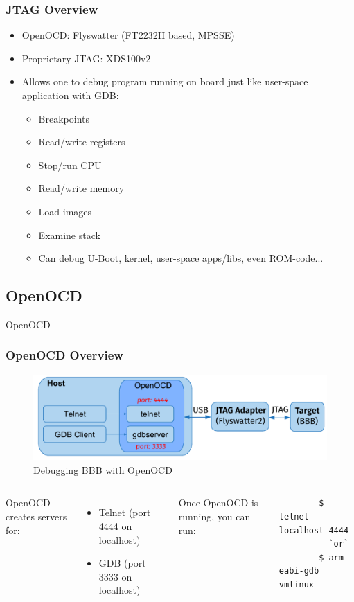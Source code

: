 \documentclass[aspectratio=169,usenames,dvipsnames]{beamer}
\newcounter{cont}
\begin{document}
\begin{frame}
  \frametitle{JTAG Overview}
  \begin{itemize}
    \item OpenOCD: Flyswatter (FT2232H based, MPSSE)
    \item Proprietary JTAG: XDS100v2
    \item Allows one to debug program running on board just like user-space
          application with GDB:
      \begin{itemize}
        \item Breakpoints
        \item Read/write registers
        \item Stop/run CPU
        \item Read/write memory
        \item Load images
        \item Examine stack
        \item Can debug U-Boot, kernel, user-space apps/libs, even ROM-code...
      \end{itemize}
  \end{itemize}
\end{frame}

\subsection{OpenOCD}

\begin{frame}[standout]
  OpenOCD
\end{frame}

\begin{frame}[containsverbatim]
  \frametitle{OpenOCD Overview}
  \begin{figure}
    \centering
    \includegraphics[scale=0.6]{images/openocd.pdf}
    \caption{Debugging BBB with OpenOCD}
  \end{figure}
  \begin{columns}
      OpenOCD creates servers for:
      \begin{itemize}
        \item Telnet (port 4444 on localhost)
        \item GDB (port 3333 on localhost)
      \end{itemize}
      Once OpenOCD is running, you can run:
      \begin{lstlisting}
        $ telnet localhost 4444
          `or`
        $ arm-eabi-gdb vmlinux
      \end{lstlisting}
  \end{columns}
\end{frame}
\end{document}
